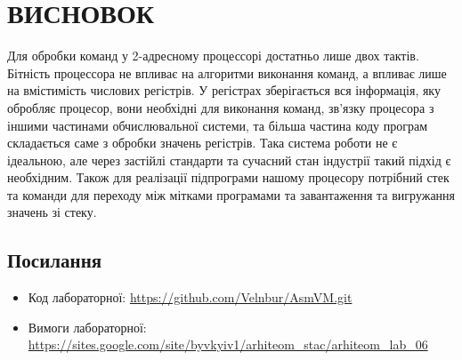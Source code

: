 \documentclass[a4paper,12pt]{report}
\begin{document}
\section{ВИСНОВОК}
Для обробки команд у 2-адресному процессорі достатньо лише двох
тактів. Бітність процессора не впливає на алгоритми виконання команд,
а впливає лише на вмістимість числових регістрів.
У регістрах зберігається вся інформація,
яку обробляє процесор, вони необхідні для виконання команд,
зв’язку процесора з іншими частинами обчислювальної системи,
та більша частина коду програм складається саме з обробки значень
регістрів. Така система роботи не є ідеальною, але через застійлі
стандарти та сучасний стан індустрії такий підхід є необхідним.
Також для реалізації підпрограми нашому процесору потрібний стек та команди
для переходу між мітками програмами та завантаження та вигружання значень
зі стеку.
\subsection{Посилання}
\begin{itemize}
    \item{Код лабораторної: \url{https://github.com/Velnbur/AsmVM.git}}
    \item{Вимоги лабораторної: \url{https://sites.google.com/site/byvkyiv1/arhiteom_stac/arhiteom_lab_06}}
\end{itemize}
\end{document}
